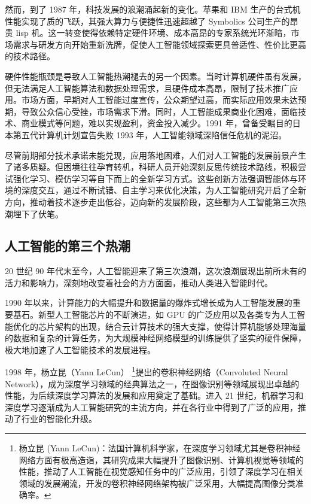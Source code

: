 然而，到了 1987 年，科技发展的浪潮涌起新的变化。苹果和 IBM 生产的台式机性能实现了质的飞跃，其强大算力与便捷性迅速超越了 Symbolics 公司生产的昂贵 lisp 机。这一转变使得依赖特定硬件环境、成本高昂的专家系统光环渐暗，市场需求与研发方向开始重新洗牌，促使人工智能领域探索更具普适性、性价比更高的技术路径。


硬件性能瓶颈是导致人工智能热潮褪去的另一个因素。当时计算机硬件虽有发展，但无法满足人工智能算法和数据处理需求，且硬件成本高昂，限制了技术推广应用。市场方面，早期对人工智能过度宣传，公众期望过高，而实际应用效果未达预期，导致公众信心受挫，市场需求下滑。同时，人工智能成果商业化困难，面临技术、商业模式等问题，难以实现盈利，资金投入减少。1991 年，曾备受瞩目的日本第五代计算机计划宣告失败 1993 年，人工智能领域深陷信任危机的泥沼。


尽管前期部分技术承诺未能兑现，应用落地困难，人们对人工智能的发展前景产生了诸多质疑。但困境往往孕育转机，科研人员开始深刻反思传统技术路线，积极尝试强化学习、模仿学习等自下而上的全新学习方式。这些创新方法强调智能体与环境的深度交互，通过不断试错、自主学习来优化决策，为人工智能研究开启了全新方向，推动着技术逐步走出低谷，迈向新的发展阶段，这些都为人工智能第三次热潮埋下了伏笔。



\subsection{人工智能的第三个热潮}


20 世纪 90 年代末至今，人工智能迎来了第三次浪潮，这次浪潮展现出前所未有的活力和影响力，深刻地改变着社会的方方面面，推动人类进入智能时代。


1990 年以来，计算能力的大幅提升和数据量的爆炸式增长成为人工智能发展的重要基石。新型人工智能芯片的不断演进，如 GPU 的广泛应用以及各类专为人工智能优化的芯片架构的出现，结合云计算技术的强大支撑，使得计算机能够处理海量的数据和复杂的计算任务，为大规模神经网络模型的训练提供了坚实的硬件保障，极大地加速了人工智能技术的发展进程。


1998 年，杨立昆（Yann LeCun） \footnote{杨立昆 (Yann LeCun)：法国计算机科学家，在深度学习领域尤其是卷积神经网络方面有极高造诣，其研究成果大幅提升了图像识别、计算机视觉等领域的性能，推动了人工智能在视觉感知任务中的广泛应用，引领了深度学习在相关领域的发展潮流，开发的卷积神经网络架构被广泛采用，大幅提高图像分类准确率。}提出的卷积神经网络（Convoluted Neural Network），成为深度学习领域的经典算法之一，在图像识别等领域展现出卓越的性能，为后续深度学习算法的发展和应用奠定了基础。进入 21 世纪，机器学习和深度学习逐渐成为人工智能研究的主流方向，并在各行业中得到了广泛的应用，推动了行业的智能化升级。


